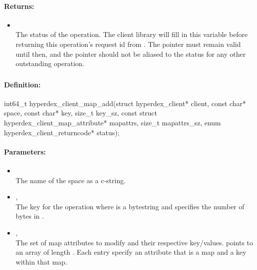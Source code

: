 \paragraph{Returns:}
\begin{itemize}[noitemsep]
\item {}\\
The status of the operation.  The client library will fill in this variable before returning this operation's request id from .  The pointer must remain valid until then, and the pointer should not be aliased to the status for any other outstanding operation.
\end{itemize}

\pagebreak
\subsubsection{}
\label{api:c:map_add}


\paragraph{Definition:}
\begin{ccode}
int64_t hyperdex_client_map_add(struct hyperdex_client* client,
        const char* space,
        const char* key, size_t key_sz,
        const struct hyperdex_client_map_attribute* mapattrs, size_t mapattrs_sz,
        enum hyperdex_client_returncode* status);
\end{ccode}

\paragraph{Parameters:}
\begin{itemize}[noitemsep]
\item {}\\
The name of the space as a c-string.
\item {}, \\
The key for the operation where  is a bytestring and  specifies the number of bytes in .
\item {}, \\
The set of map attributes to modify and their respective key/values.   points to an array of length .  Each entry specify an attribute that is a map and a key within that map.
\end{itemize}

